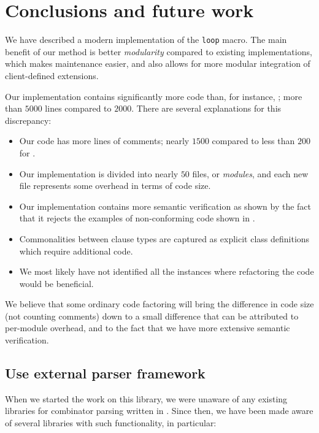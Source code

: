 \section{Conclusions and future work}

We have described a modern implementation of the \commonlisp{}
\texttt{loop} macro.  The main benefit of our method is better
\emph{modularity} compared to existing implementations, which makes
maintenance easier, and also allows for more modular integration of
client-defined extensions.

Our implementation contains significantly more code than, for
instance, \mitloop{}; more than $5000$ lines compared to $2000$.  There
are several explanations for this discrepancy:

\begin{itemize}
\item Our code has more lines of comments; nearly $1500$ compared to
  less than $200$ for \mitloop{}.
\item Our implementation is divided into nearly $50$ files, or
  \emph{modules}, and each new file represents some overhead in terms
  of code size.
\item Our implementation contains more semantic verification as shown
  by the fact that it rejects the examples of non-conforming code shown
  in .
\item Commonalities between clause types are captured as explicit
  class definitions which require additional code.
\item We most likely have not identified all the instances where
  refactoring the code would be beneficial.
\end{itemize}

We believe that some ordinary code factoring will bring the difference
in code size (not counting comments) down to a small difference that
can be attributed to per-module overhead, and to the fact that we have
more extensive semantic verification.

\subsection{Use external parser framework}
\label{sec-using-external-parser-framework}

When we started the work on this library, we were unaware of any
existing libraries for combinator parsing written in \commonlisp{}.
Since then, we have been made aware of several libraries with such
functionality, in particular:

